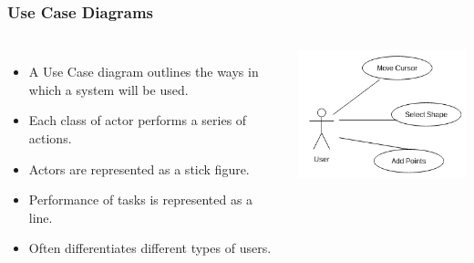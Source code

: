 \documentclass{beamer}
\begin{document}
\begin{frame}
    \frametitle{Use Case Diagrams}
    \begin{columns}
    \begin{itemize}[<+->]
        \item A Use Case diagram outlines the ways in which a system will be used.
        \item Each class of actor performs a series of actions.
        \item Actors are represented as a stick figure.
        \item Performance of tasks is represented as a line.
        \item Often differentiates different types of users.
    \end{itemize}
    
    \includegraphics[width=\textwidth]{images/shapeUser}
    \end{columns}
\end{frame}
\end{document}
